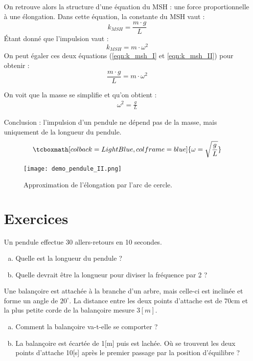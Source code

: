 On retrouve alors la structure d'une équation du MSH : une force proportionnelle à une élongation.
Dans cette équation, la constante du MSH vaut :
\begin{equation}
    \label{eqn:k_msh_I}
    k_{MSH}=\frac{m \cdot g}{L}
\end{equation}
Étant donné que l'impulsion vaut :
\begin{equation}
    \label{eqn:k_msh_II}
    k_{MSH}=m \cdot \omega^2
\end{equation}
On peut égaler ces deux équations (\ref{eqn:k_msh_I} et \ref{eqn:k_msh_II}) pour obtenir :
\begin{equation}
    \frac{m \cdot g}{L} = m \cdot \omega^2
\end{equation}

On voit que la masse se simplifie et qu'on obtient :
\begin{align}
    \omega^2=\frac{g}{L}
\end{align}

Conclusion : l'impulsion d'un pendule ne dépend pas de la masse, mais uniquement de la longueur du pendule.
\begin{equation}
    \tcboxmath[colback=LightBlue,colframe=blue]{\omega = \sqrt{\frac{g}{L}}}
\end{equation}

\newpage
\begin{figure}[h!]
    \centering
    \texttt{[image: demo\_pendule\_II.png]}
    \caption{Approximation de l'élongation par l'arc de cercle.}
    \label{fig:demo_pendule_II}
\end{figure}

\section{Exercices}
\begin{exercise}
    Un pendule effectue 30 allers-retours en 10 secondes.
    \begin{enumerate}[a)]
        \item Quelle est la longueur du pendule ?
        \item Quelle devrait être la longueur pour diviser la fréquence par 2 ?
    \end{enumerate}
\end{exercise}

\begin{exercise}
    Une balançoire est attachée à la branche d'un arbre, mais celle-ci est inclinée et forme un angle de \(20^{\circ}\). La distance entre les deux points d'attache est de 70cm et la plus petite corde de la balançoire mesure \(3[m]\).
    \begin{enumerate}[a)]
        \item Comment la balançoire va-t-elle se comporter ?
        \item La balançoire est écartée de 1[m] puis est lachée. Où se trouvent les deux points d'attache 10[s] après le premier passage par la position d'équilibre ?
    \end{enumerate}
\end{exercise}


